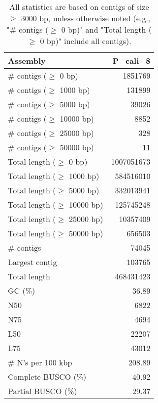 \documentclass[12pt,a4paper]{article}
\begin{document}
\begin{table}[ht]
\begin{center}
\caption{All statistics are based on contigs of size $\geq$ 3000 bp, unless otherwise noted (e.g., "\# contigs ($\geq$ 0 bp)" and "Total length ($\geq$ 0 bp)" include all contigs).}
\begin{tabular}{|l*{1}{|r}|}
\hline
Assembly & P\_cali\_8 \\ \hline
\# contigs ($\geq$ 0 bp) & 1851769 \\ \hline
\# contigs ($\geq$ 1000 bp) & 131899 \\ \hline
\# contigs ($\geq$ 5000 bp) & 39026 \\ \hline
\# contigs ($\geq$ 10000 bp) & 8852 \\ \hline
\# contigs ($\geq$ 25000 bp) & 328 \\ \hline
\# contigs ($\geq$ 50000 bp) & 11 \\ \hline
Total length ($\geq$ 0 bp) & 1007051673 \\ \hline
Total length ($\geq$ 1000 bp) & 584516010 \\ \hline
Total length ($\geq$ 5000 bp) & 332013941 \\ \hline
Total length ($\geq$ 10000 bp) & 125745248 \\ \hline
Total length ($\geq$ 25000 bp) & 10357409 \\ \hline
Total length ($\geq$ 50000 bp) & 656503 \\ \hline
\# contigs & 74045 \\ \hline
Largest contig & 103765 \\ \hline
Total length & 468431423 \\ \hline
GC (\%) & 36.89 \\ \hline
N50 & 6822 \\ \hline
N75 & 4694 \\ \hline
L50 & 22207 \\ \hline
L75 & 43012 \\ \hline
\# N's per 100 kbp & 208.89 \\ \hline
Complete BUSCO (\%) & 40.92 \\ \hline
Partial BUSCO (\%) & 29.37 \\ \hline
\end{tabular}
\end{center}
\end{table}
\end{document}
